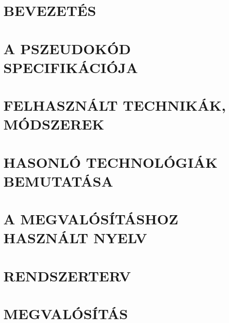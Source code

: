\documentclass[12pt,a4paper]{article}
\begin{document}


% 

% 


\newpage
\tableofcontents
\newpage





\clearpage
\section{BEVEZETÉS}


\clearpage
\section{A PSZEUDOKÓD SPECIFIKÁCIÓJA}
\label{sec:specification}


\clearpage
\section{FELHASZNÁLT TECHNIKÁK, MÓDSZEREK}
\label{sec:techniques}


\clearpage
\section{HASONLÓ TECHNOLÓGIÁK BEMUTATÁSA}
\label{sec:similar}


\clearpage
\section{A MEGVALÓSÍTÁSHOZ HASZNÁLT NYELV}
\label{sec:language}


\clearpage
\section{RENDSZERTERV}
\label{sec:plan}


\clearpage
\section{MEGVALÓSÍTÁS}
\label{sec:execution}

\end{document}

